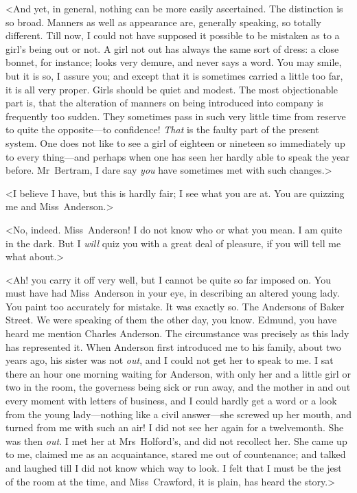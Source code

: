 <And yet, in general, nothing can be more easily ascertained. The distinction is so broad. Manners as well as appearance are, generally speaking, so totally different. Till now, I could not have supposed it possible to be mistaken as to a girl's being out or not. A girl not out has always the same sort of dress: a close bonnet, for instance; looks very demure, and never says a word. You may smile, but it is so, I assure you; and except that it is sometimes carried a little too far, it is all very proper. Girls should be quiet and modest. The most objectionable part is, that the alteration of manners on being introduced into company is frequently too sudden. They sometimes pass in such very little time from reserve to quite the opposite—to confidence! \textit{That}  is the faulty part of the present system. One does not like to see a girl of eighteen or nineteen so immediately up to every thing—and perhaps when one has seen her hardly able to speak the year before. Mr~Bertram, I dare say \textit{you}  have sometimes met with such changes.>

<I believe I have, but this is hardly fair; I see what you are at. You are quizzing me and Miss~Anderson.>

<No, indeed. Miss~Anderson! I do not know who or what you mean. I am quite in the dark. But I \textit{will}  quiz you with a great deal of pleasure, if you will tell me what about.>

<Ah! you carry it off very well, but I cannot be quite so far imposed on. You must have had Miss~Anderson in your eye, in describing an altered young lady. You paint too accurately for mistake. It was exactly so. The Andersons of Baker Street. We were speaking of them the other day, you know. Edmund, you have heard me mention Charles Anderson. The circumstance was precisely as this lady has represented it. When Anderson first introduced me to his family, about two years ago, his sister was not \textit{out}, and I could not get her to speak to me. I sat there an hour one morning waiting for Anderson, with only her and a little girl or two in the room, the governess being sick or run away, and the mother in and out every moment with letters of business, and I could hardly get a word or a look from the young lady—nothing like a civil answer—she screwed up her mouth, and turned from me with such an air! I did not see her again for a twelvemonth. She was then \textit{out}. I met her at Mrs~Holford's, and did not recollect her. She came up to me, claimed me as an acquaintance, stared me out of countenance; and talked and laughed till I did not know which way to look. I felt that I must be the jest of the room at the time, and Miss~Crawford, it is plain, has heard the story.>

